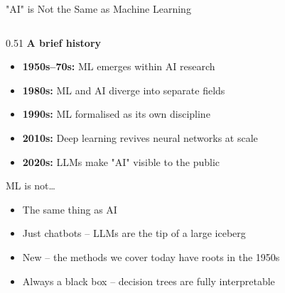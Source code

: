 \documentclass[aspectratio=169, 10pt]{beamer}
\begin{document}
\begin{frame}{"AI" is Not the Same as Machine Learning}
\begin{columns}[T]
\begin{column}{0.51\textwidth}
\vspace{0.55em}
\textbf{A brief history}
\begin{itemize}
  \setlength\itemsep{0.22em}
  \item \textbf{1950s--70s:} ML emerges within AI research
  \item \textbf{1980s:} ML and AI diverge into separate fields
  \item \textbf{1990s:} ML formalised as its own discipline
  \item \textbf{2010s:} Deep learning revives neural networks at scale
  \item \textbf{2020s:} LLMs make "AI" visible to the public
\end{itemize}

\vspace{0.55em}
\begin{alertblock}{ML is not\ldots}
\begin{itemize}
  \setlength\itemsep{0.18em}
  \item The same thing as AI
  \item Just chatbots -- LLMs are the tip of a large iceberg
  \item New -- the methods we cover today have roots in the 1950s
  \item Always a black box -- decision trees are fully interpretable
\end{itemize}
\end{alertblock}
\end{column}
\end{columns}
\end{frame}
\end{document}
